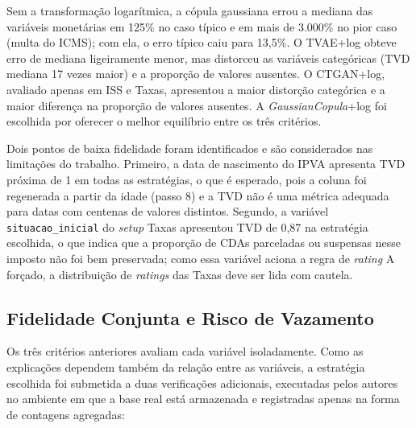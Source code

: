 Sem a transformação logarítmica, a cópula gaussiana errou a mediana das variáveis monetárias em 125\% no caso típico e em mais de 3.000\% no pior caso (multa do ICMS); com ela, o erro típico caiu para 13,5\%. O TVAE+log obteve erro de mediana ligeiramente menor, mas distorceu as variáveis categóricas (TVD mediana 17 vezes maior) e a proporção de valores ausentes. O CTGAN+log, avaliado apenas em ISS e Taxas, apresentou a maior distorção categórica e a maior diferença na proporção de valores ausentes. A \textit{GaussianCopula}+log foi escolhida por oferecer o melhor equilíbrio entre os três critérios.

Dois pontos de baixa fidelidade foram identificados e são considerados nas limitações do trabalho. Primeiro, a data de nascimento do IPVA apresenta TVD próxima de 1 em todas as estratégias, o que é esperado, pois a coluna foi regenerada a partir da idade (passo 8) e a TVD não é uma métrica adequada para datas com centenas de valores distintos. Segundo, a variável \texttt{situacao\_inicial} do \textit{setup} Taxas apresentou TVD de 0,87 na estratégia escolhida, o que indica que a proporção de CDAs parceladas ou suspensas nesse imposto não foi bem preservada; como essa variável aciona a regra de \textit{rating} A forçado, a distribuição de \textit{ratings} das Taxas deve ser lida com cautela.

\subsection{Fidelidade Conjunta e Risco de Vazamento}
\label{subsec:fidelidade_conjunta}

Os três critérios anteriores avaliam cada variável isoladamente. Como as explicações dependem também da relação entre as variáveis, a estratégia escolhida foi submetida a duas verificações adicionais, executadas pelos autores no ambiente em que a base real está armazenada e registradas apenas na forma de contagens agregadas:

